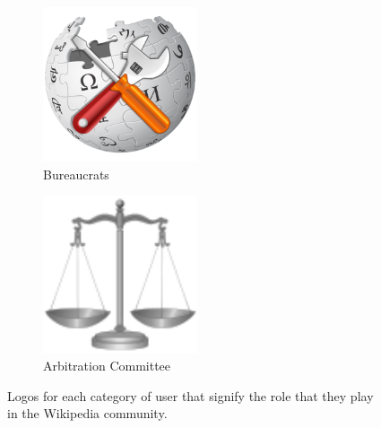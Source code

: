 \begin{figure}[h!]
    \begin{subfigure}[b]{0.49\textwidth}
        \centering
        \includegraphics[width=0.5\textwidth]{images/bureaucrat.png}
        \caption{Bureaucrats}
        \label{fig:crats}
    \end{subfigure}
    \begin{subfigure}[b]{0.49\textwidth}
        \centering
        \includegraphics[width=0.5\textwidth]{images/arbcom.png}
        \caption{Arbitration Committee}
        \label{fig:arbs}
    \end{subfigure}
    \caption{Logos for each category of user that signify the role that they play in the Wikipedia community.}
    \label{fig:logos}
\end{figure}

